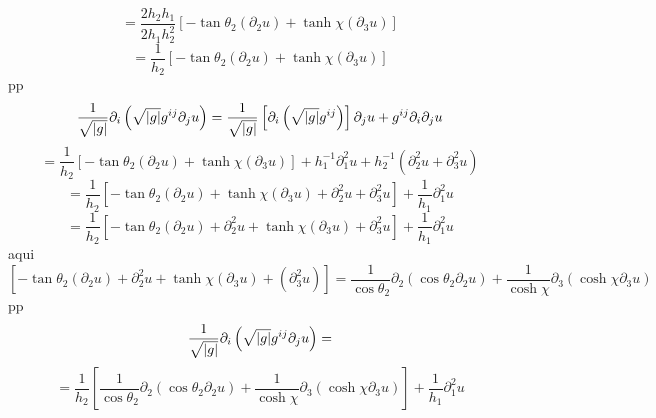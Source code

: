 \documentclass[a4paper,12pt]{article}
\begin{document}
\begin{equation*}
=\frac{2h_{2}h_{1}}{2h_{1}h_{2}^{2}}\left[ -\tan \theta _{2}\left( \partial
_{2}u\right) +\tanh \chi \left( \partial _{3}u\right) \right] 
\end{equation*}%
\begin{equation*}
=\frac{1}{h_{2}}\left[ -\tan \theta _{2}\left( \partial _{2}u\right) +\tanh
\chi \left( \partial _{3}u\right) \right] 
\end{equation*}%
pp%
\begin{equation*}
\frac{1}{\sqrt{\left\vert g\right\vert }}\partial _{i}\left( \sqrt{%
\left\vert g\right\vert }g^{ij}\partial _{j}u\right) =\frac{1}{\sqrt{%
\left\vert g\right\vert }}\left[ \partial _{i}\left( \sqrt{\left\vert
g\right\vert }g^{ij}\right) \right] \partial _{j}u+g^{ij}\partial
_{i}\partial _{j}u
\end{equation*}%
\begin{equation*}
=\frac{1}{h_{2}}\left[ -\tan \theta _{2}\left( \partial _{2}u\right) +\tanh
\chi \left( \partial _{3}u\right) \right] +h_{1}^{-1}\partial
_{1}^{2}u+h_{2}^{-1}\left( \partial _{2}^{2}u+\partial _{3}^{2}u\right) 
\end{equation*}%
\begin{equation*}
=\frac{1}{h_{2}}\left[ -\tan \theta _{2}\left( \partial _{2}u\right) +\tanh
\chi \left( \partial _{3}u\right) +\partial _{2}^{2}u+\partial _{3}^{2}u%
\right] +\frac{1}{h_{1}}\partial _{1}^{2}u
\end{equation*}%
\begin{equation*}
=\frac{1}{h_{2}}\left[ -\tan \theta _{2}\left( \partial _{2}u\right)
+\partial _{2}^{2}u+\tanh \chi \left( \partial _{3}u\right) +\partial
_{3}^{2}u\right] +\frac{1}{h_{1}}\partial _{1}^{2}u
\end{equation*}%
aqui%
\begin{equation*}
\left[ -\tan \theta _{2}\left( \partial _{2}u\right) +\partial
_{2}^{2}u+\tanh \chi \left( \partial _{3}u\right) +\left( \partial
_{3}^{2}u\right) \right] =\frac{1}{\cos \theta _{2}}\partial _{2}\left( \cos
\theta _{2}\partial _{2}u\right) +\frac{1}{\cosh \chi }\partial _{3}\left(
\cosh \chi \partial _{3}u\right) 
\end{equation*}%
pp%
\begin{equation*}
\frac{1}{\sqrt{\left\vert g\right\vert }}\partial _{i}\left( \sqrt{%
\left\vert g\right\vert }g^{ij}\partial _{j}u\right) =
\end{equation*}%
\begin{equation*}
=\frac{1}{h_{2}}\left[ \frac{1}{\cos \theta _{2}}\partial _{2}\left( \cos
\theta _{2}\partial _{2}u\right) +\frac{1}{\cosh \chi }\partial _{3}\left(
\cosh \chi \partial _{3}u\right) \right] +\frac{1}{h_{1}}\partial _{1}^{2}u
\end{equation*}%
\end{document}
